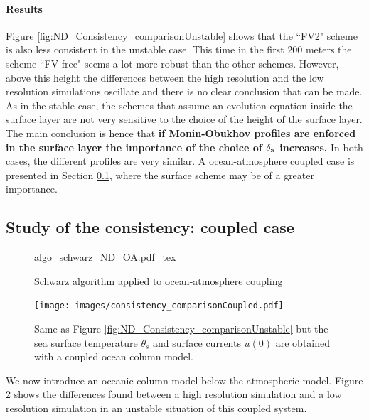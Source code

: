 \paragraph{Results}
Figure \ref{fig:ND_Consistency_comparisonUnstable}
shows that the ``FV2" scheme is also less consistent
in the unstable case.
This time in the first $200$ meters the scheme ``FV free" seems a lot
more robust than the other schemes.
However, above this height the differences between the high
resolution and the low resolution simulations oscillate and there
is no clear conclusion that can be made.
As in the stable case, the schemes that assume an evolution equation
inside the surface layer are not very sensitive to the choice of
the height of the surface layer.
The main conclusion is hence that
\textbf{if Monin-Obukhov profiles are enforced in the
surface layer the importance of the choice of
$\delta_{\rm a}$ increases.}
In both cases, the different profiles are very similar.
A ocean-atmosphere coupled case is presented in Section
\ref{sec:ND_Consistency_Coupled}, where the surface scheme may be of a greater
importance.
\subsection{Study of the consistency: coupled case}
\label{sec:ND_Consistency_Coupled}
\begin{figure}
	\centering
	{algo_schwarz_ND_OA.pdf_tex}
	\caption{Schwarz algorithm applied to ocean-atmosphere
		coupling}
	\label{fig:ND_Consistency_schwarz_algo}
\end{figure}
\begin{figure}
	\centering
	\texttt{[image: images/consistency\_comparisonCoupled.pdf]}
	\caption{Same as Figure
	\ref{fig:ND_Consistency_comparisonUnstable} but the sea
	surface temperature $\theta_s$ and surface currents
	$u(0)$ are obtained with a coupled ocean column model.}
	\label{fig:ND_Consistency_comparisonCoupled}
\end{figure}
We now introduce an oceanic column model below the
atmospheric model.
Figure \ref{fig:ND_Consistency_comparisonCoupled}
shows the differences found between a high resolution simulation
and a low resolution simulation in an unstable situation of
this coupled system.
